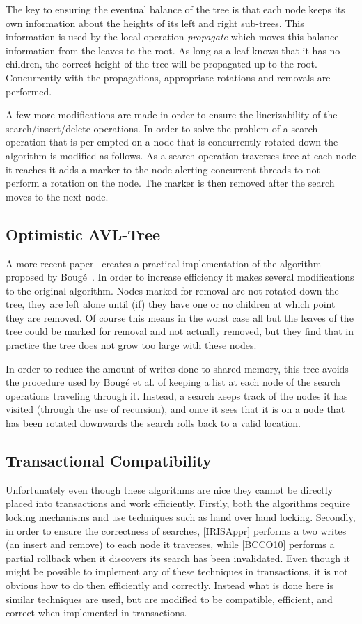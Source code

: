 \documentclass[10pt]{sigplanconf}
\begin{document}
The key to ensuring the eventual balance of the tree is that each node keeps its own information about the heights of its left and right sub-trees.
This information is used by the local operation \emph{propagate} which moves this balance information from the leaves to the root.
As long as a leaf knows that it has no children, the correct height of the tree will be propagated up to the root.
Concurrently with the propagations, appropriate rotations and removals are performed.

A few more modifications are made in order to ensure the linerizability of the search/insert/delete operations.
In order to solve the problem of a search operation that is per-empted on a node that is concurrently rotated down the algorithm is modified as follows.
As a search operation traverses tree at each node it reaches it adds a marker to the node alerting concurrent threads to not perform a rotation on the node.
The marker is then removed after the search moves to the next node.

\subsection{Optimistic AVL-Tree}
A more recent paper~\cite{BCCO10} creates a practical implementation of the algorithm proposed by Boug\'e~\cite{IRISAppr}.
In order to increase efficiency it makes several modifications to the original algorithm.
Nodes marked for removal are not rotated down the tree, they are left alone until (if) they have one or no children at which point they are removed.
Of course this means in the worst case all but the leaves of the tree could be marked for removal and not actually removed, but they find that in practice the tree does not grow too large with these nodes.

In order to reduce the amount of writes done to shared memory, this tree avoids the procedure used by Boug\'e et al. of keeping a list at each node of the search operations traveling through it.
Instead, a search keeps track of the nodes it has visited (through the use of recursion), and once it sees that it is on a node that has been rotated downwards the search rolls back to a valid location.

\subsection{Transactional Compatibility}
Unfortunately even though these algorithms are nice they cannot be directly placed into transactions and work efficiently.
Firstly, both the algorithms require locking mechanisms and use techniques such as hand over hand locking.
Secondly, in order to ensure the correctness of searches, \ref{IRISAppr} performs a two writes (an insert and remove) to each node it traverses, while \ref{BCCO10} performs a partial rollback when it discovers its search has been invalidated.
Even though it might be possible to implement any of these techniques in transactions, it is not obvious how to do then efficiently and correctly.
Instead what is done here is similar techniques are used, but are modified to be compatible, efficient, and correct when implemented in transactions.
\end{document}
